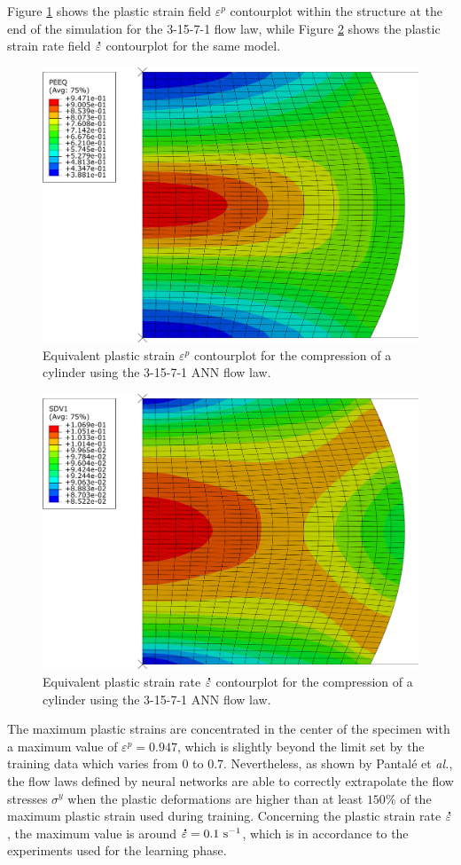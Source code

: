 \documentclass[algorithms,article,submit,pdftex,moreauthors]{Definitions/mdpi}
\makeatletter
\DeclareRobustCommand{\mdot}[1]{\accentset{\mbox{\bfseries .}}{#1}}
\DeclareRobustCommand{\eal}{et \emph{al.}\@\xspace}
\DeclareRobustCommand{\ps}{\text{s}^{-1}}
\makeatother
\begin{document}
Figure \ref{fig:peeqContourplot} shows the plastic strain field $\varepsilon^p$ contourplot within the structure at the end of the simulation for the 3-15-7-1 flow law, while Figure \ref{fig:dpeeqContourplot} shows the plastic strain rate field $\mdot\varepsilon$ contourplot for the same model.
\begin{figure}[!ht]
\centering
\includegraphics[width=0.60\columnwidth]{Figures/peeq}
\caption{Equivalent plastic strain $\varepsilon^p$ contourplot for the compression of a cylinder using the 3-15-7-1 ANN flow law.}
\label{fig:peeqContourplot}
\end{figure}
\begin{figure}[!ht]
\centering
\includegraphics[width=0.60\columnwidth]{Figures/sdv1}
\caption{Equivalent plastic strain rate $\mdot\varepsilon$ contourplot for the compression of a cylinder using the 3-15-7-1 ANN flow law.}
\label{fig:dpeeqContourplot}
\end{figure}
The maximum plastic strains are concentrated in the center of the specimen with a maximum value of $\varepsilon^p=0.947$, which is slightly beyond the limit set by the training data which varies from $0$ to $0.7$.
Nevertheless, as shown by Pantalé \eal \cite{Pantale-2021}, the flow laws defined by neural networks are able to correctly extrapolate the flow stresses $\sigma^y$ when the plastic deformations are higher than at least $150\%$ of the maximum plastic strain used during training.
Concerning the plastic strain rate $\mdot\varepsilon$, the maximum value is around $\mdot\varepsilon=0.1~\ps$, which is in accordance to the experiments used for the learning phase.
\end{document}
